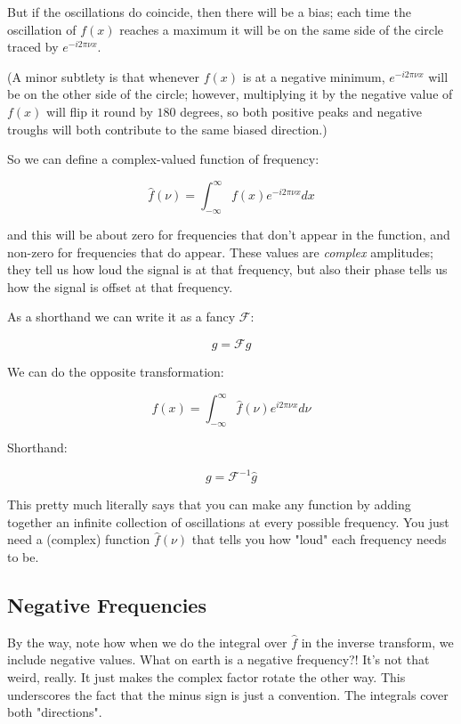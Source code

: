But if the oscillations do coincide, then there will be a bias; each time the oscillation of $f(x)$ reaches a maximum it will be on the same side of the circle traced by $e^{-i2\pi\nu x}$.

(A minor subtlety is that whenever $f(x)$ is at a negative minimum, $e^{-i2\pi\nu x}$ will be on the other side of the circle; however, multiplying it by the negative value of $f(x)$ will flip it round by $180$ degrees, so both positive peaks and negative troughs will both contribute to the same biased direction.)

So we can define a complex-valued function of frequency:

\begin{equation}
    \hat{f}(\nu) = \int_{-\infty}^{\infty} f(x)e^{-i2\pi\nu x} dx
    \label{eq:fourier}
\end{equation}

and this will be about zero for frequencies that don't appear in the function, and non-zero for frequencies that do appear. These values are \textit{complex} amplitudes; they tell us how loud the signal is at that frequency, but also their phase tells us how the signal is offset at that frequency.

As a shorthand we can write it as a fancy $\mathcal{F}$:

$$\hat{g} = \mathcal{F} g$$

We can do the opposite transformation:

\begin{equation}    
f(x) = \int_{-\infty}^{\infty} \hat{f}(\nu)e^{i2\pi\nu x} d\nu
\label{eq:invfourier}
\end{equation}

Shorthand:

$$g = \mathcal{F}^{-1} \hat{g}$$

This pretty much literally says that you can make any function by adding together an infinite collection of oscillations at every possible frequency. You just need a (complex) function $\hat{f}(\nu)$ that tells you how "loud" each frequency needs to be.

\subsection{Negative Frequencies}

By the way, note how when we do the integral over $\hat{f}$ in the inverse transform, we include negative values. What on earth is a negative frequency?! It's not that weird, really. It just makes the complex factor rotate the other way. This underscores the fact that the minus sign is just a convention. The integrals cover both "directions".

